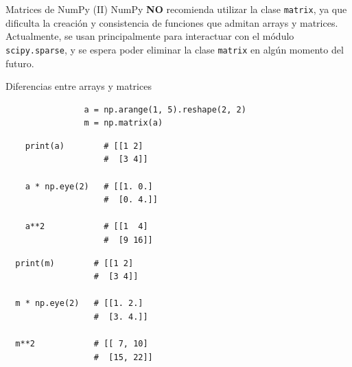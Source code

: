 \documentclass[10pt]{beamer} %
\begin{document}
\begin{frame}{Matrices de NumPy (II)}
    NumPy \textbf{NO} recomienda utilizar la clase \texttt{matrix}, ya que dificulta la creación y consistencia de funciones que admitan arrays y matrices. Actualmente, se usan principalmente para interactuar con el módulo \texttt{scipy.sparse}, y se espera poder eliminar la clase \texttt{matrix} en algún momento del futuro.
\end{frame}

\begin{frame}[fragile]{Diferencias entre arrays y matrices}
    \begin{verbatim}
                a = np.arange(1, 5).reshape(2, 2)
                m = np.matrix(a)
    \end{verbatim}
    \vspace{10pt}
    \begin{multicols}{2}
    \begin{verbatim}
    print(a)        # [[1 2]
                    #  [3 4]]

    a * np.eye(2)   # [[1. 0.]
                    #  [0. 4.]]

    a**2            # [[1  4]
                    #  [9 16]]
    \end{verbatim}
    \columnbreak
    \begin{verbatim}
  print(m)        # [[1 2]
                  #  [3 4]]
  
  m * np.eye(2)   # [[1. 2.]
                  #  [3. 4.]]
  
  m**2            # [[ 7, 10]
                  #  [15, 22]]
    \end{verbatim}
    \end{multicols}
\end{frame}
\end{document}
